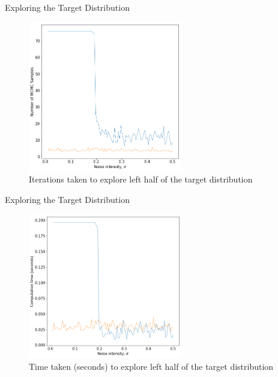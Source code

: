 \documentclass[10pt]{beamer}
\begin{document}
\begin{frame}[fragile]{Exploring the Target Distribution}
        \begin{figure}
                \centering
                \includegraphics[width=0.6\textwidth]{iters_vs_noise.png}
                \caption{Iterations taken to explore left half of the target distribution}
        \end{figure}
\end{frame}

\begin{frame}[fragile]{Exploring the Target Distribution}
        \begin{figure}
            \centering
            \includegraphics[width=0.6\textwidth]{time_vs_noise.png}
            \caption{Time taken (seconds) to explore left half of the target distribution}
        \end{figure}
\end{frame}
\end{document}
